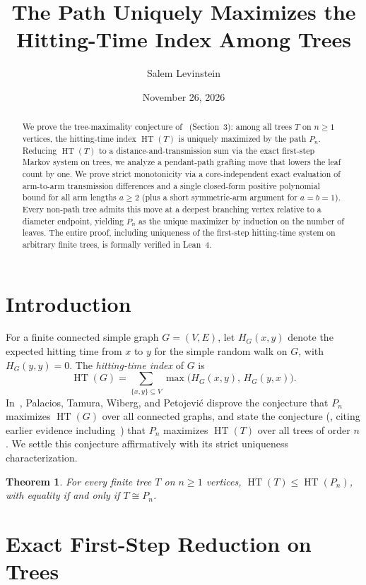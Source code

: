 \documentclass[11pt]{article}
\title{The Path Uniquely Maximizes the Hitting-Time Index Among Trees}
\author{Salem Levinstein}
\date{November 26, 2026}
\newtheorem{theorem}{Theorem}
\newcommand{\HT}{\operatorname{HT}}
\begin{document}
\maketitle

\begin{abstract}
We prove the tree-maximality conjecture of~\cite{Palacios2026} (Section~3): among all trees $T$ on $n \ge 1$ vertices, the hitting-time index $\HT(T)$ is uniquely maximized by the path $P_n$. Reducing $\HT(T)$ to a distance-and-transmission sum via the exact first-step Markov system on trees, we analyze a pendant-path grafting move that lowers the leaf count by one. We prove strict monotonicity via a core-independent exact evaluation of arm-to-arm transmission differences and a single closed-form positive polynomial bound for all arm lengths $a \ge 2$ (plus a short symmetric-arm argument for $a = b = 1$). Every non-path tree admits this move at a deepest branching vertex relative to a diameter endpoint, yielding $P_n$ as the unique maximizer by induction on the number of leaves. The entire proof, including uniqueness of the first-step hitting-time system on arbitrary finite trees, is formally verified in Lean~4.
\end{abstract}

\section{Introduction}

For a finite connected simple graph $G = (V, E)$, let $H_G(x, y)$ denote the expected hitting time from $x$ to $y$ for the simple random walk on $G$, with $H_G(y, y) = 0$. The \emph{hitting-time index} of $G$ is
\[
  \HT(G) = \sum_{\{x, y\} \subseteq V} \max\bigl(H_G(x, y),\, H_G(y, x)\bigr).
\]
In~\cite{Palacios2026}, Palacios, Tamura, Wiberg, and Petojevi\'c disprove the conjecture that $P_n$ maximizes $\HT(G)$ over all connected graphs, and state the conjecture (\cite[\S3]{Palacios2026}, citing earlier evidence including~\cite{PalaciosPetojevic}) that $P_n$ maximizes $\HT(T)$ over all trees of order $n$. We settle this conjecture affirmatively with its strict uniqueness characterization.

\begin{theorem}\label{thm:main}
For every finite tree $T$ on $n \ge 1$ vertices, $\HT(T) \le \HT(P_n)$, with equality if and only if $T \cong P_n$.
\end{theorem}

\section{Exact First-Step Reduction on Trees}
\end{document}
